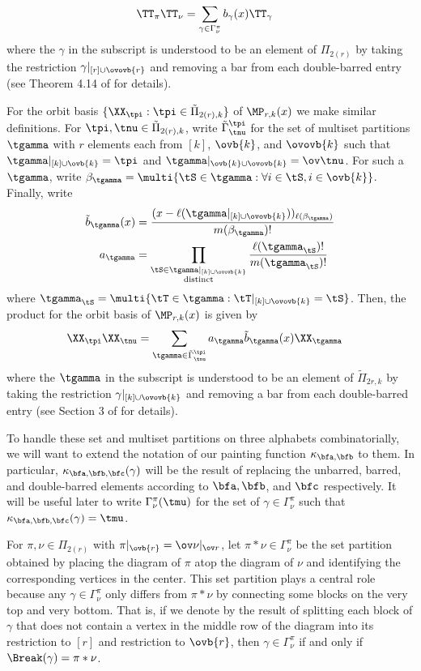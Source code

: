 \begin{align*}
    \TT_\pi \TT_\nu&=\sum_{\gamma\in\Gamma^\pi_\nu}b_\gamma(x)\TT_\gamma
\end{align*} where the $\gamma$ in the subscript is understood to be an element of $\Pi_{2(r)}$ by taking the restriction $\gamma|_{[r]\cup\ovovb{r}}$ and removing a bar from each double-barred entry (see Theorem 4.14 of \cite{Benkart2019PartitionAA} for details).

For the orbit basis $\{\XX_\tpi:\tpi\in\tilde\Pi_{2(r),k}\}$ of $\MP_{r,k}(x)$ we make similar definitions. For $\tpi,\tnu\in\tilde\Pi_{2(r),k}$, write $\tilde\Gamma^\tpi_\tnu$ for the set of multiset partitions $\tgamma$ with $r$ elements each from $[k]$, $\ovb{k}$, and $\ovovb{k}$ such that $\tgamma|_{[k]\cup\ovb{k}}=\tpi$ and $\tgamma|_{\ovb{k}\cup\ovovb{k}}=\ov\tnu$. For such a $\tgamma$, write $\beta_\tgamma=\multi{\tS\in\tgamma:\forall i\in \tS, i\in\ovb{k}}$. Finally, write \begin{align*}
    \tilde{b}_\tgamma(x)&=\frac{(x-\ell(\tgamma|_{[k]\cup\ovovb{k}}))_{\ell(\beta_\tgamma)}}{m(\beta_\tgamma)!}\\
    a_\tgamma&=\prod_{\substack{\tS\in\tgamma|_{[k]\cup\ovovb{k}}\\\text{distinct}}}\frac{\ell(\tgamma_\tS)!}{m(\tgamma_\tS)!}
\end{align*} where $\tgamma_\tS=\multi{\tT\in\tgamma:\tT|_{[k]\cup\ovovb{k}}=\tS}$. Then, the product for the orbit basis of $\MP_{r,k}(x)$ is given by \begin{align*}
    \XX_\tpi \XX_\tnu &=\sum_{\tgamma\in\tilde\Gamma^\tpi_\tnu} a_\tgamma \tilde{b}_\tgamma(x) \XX_\tgamma
\end{align*} where the $\tgamma$ in the subscript is understood to be an element of $\tilde{\Pi}_{2r,k}$ by taking the restriction $\gamma|_{[k]\cup\ovovb{k}}$ and removing a bar from each double-barred entry (see Section 3 of \cite{orellana2020howe} for details).

To handle these set and multiset partitions on three alphabets combinatorially, we will want to extend the notation of our painting function $\kappa_{\bfa,\bfb}$ to them. In particular, $\kappa_{\bfa,\bfb,\bfc}(\gamma)$ will be the result of replacing the unbarred, barred, and double-barred elements according to $\bfa,\bfb$, and $\bfc$ respectively. It will be useful later to write $\Gamma_\nu^\pi(\tmu)$ for the set of $\gamma\in\Gamma_\nu^\pi$ such that $\kappa_{\bfa,\bfb,\bfc}(\gamma)=\tmu$.

For $\pi,\nu\in\Pi_{2(r)}$ with $\pi|_{\ovb{r}}=\ov\nu|_{\ov r}$, let $\pi\ast\nu\in\Gamma^\pi_\nu$ be the set partition obtained by placing the diagram of $\pi$ atop the diagram of $\nu$ and identifying the corresponding vertices in the center. This set partition plays a central role because any $\gamma\in\Gamma^\pi_\nu$ only differs from $\pi\ast\nu$ by connecting some blocks on the very top and very bottom. That is, if we denote by  the result of splitting each block of $\gamma$ that does not contain a vertex in the middle row of the diagram into its restriction to $[r]$ and restriction to $\ovb{r}$, then $\gamma\in\Gamma^\pi_\nu$ if and only if $\Break(\gamma)=\pi\ast\nu$.

